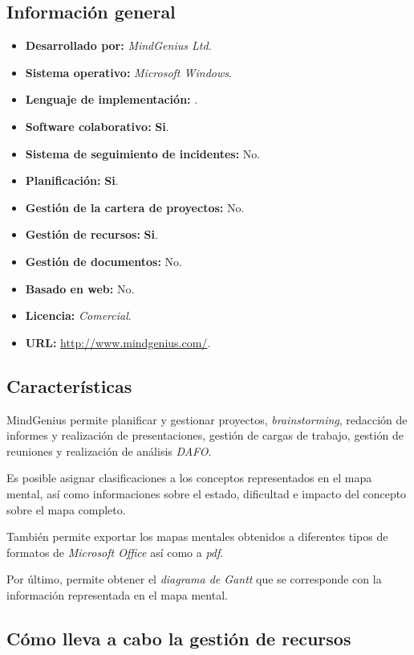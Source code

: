 \documentclass[11pt,a4paper,spanish,twoside]{report}
\begin{document}
  \subsection{Información general}
    \begin{itemize}
        \item\textbf{Desarrollado por:} \emph{MindGenius Ltd.}
	\item\textbf{Sistema operativo:} \emph{Microsoft Windows}.
	\item\textbf{Lenguaje de implementación:} .
        \item\textbf{Software colaborativo:} \textbf{Si}. 
        \item\textbf{Sistema de seguimiento de incidentes:} No. 
	\item\textbf{Planificación:} \textbf{Si}.
	\item\textbf{Gestión de la cartera de proyectos:} No.
	\item\textbf{Gestión de recursos:} \textbf{Si}.
	\item\textbf{Gestión de documentos:} No.
	\item\textbf{Basado en web:} No.
	\item\textbf{Licencia:} \emph{Comercial}.
	\item\textbf{URL:} \url{http://www.mindgenius.com/}.
	\end{itemize}
	\subsection{Características}

        MindGenius permite planificar y gestionar proyectos, \emph{brainstorming},
        redacción de informes y realización de presentaciones, gestión de
        cargas de trabajo, gestión de reuniones y realización de análisis
        \emph{DAFO}.

        Es posible asignar clasificaciones a los conceptos representados en
        el mapa mental, así como informaciones sobre el estado, dificultad e
        impacto del concepto sobre el mapa completo. 

        También permite exportar los mapas mentales obtenidos a diferentes
        tipos de formatos de \emph{Microsoft Office} así como a \emph{pdf}. 

        Por último, permite obtener el \emph{diagrama de Gantt} que se
        corresponde con la información representada en el mapa mental.

	\subsection{Cómo lleva a cabo la gestión de recursos}
\end{document}

